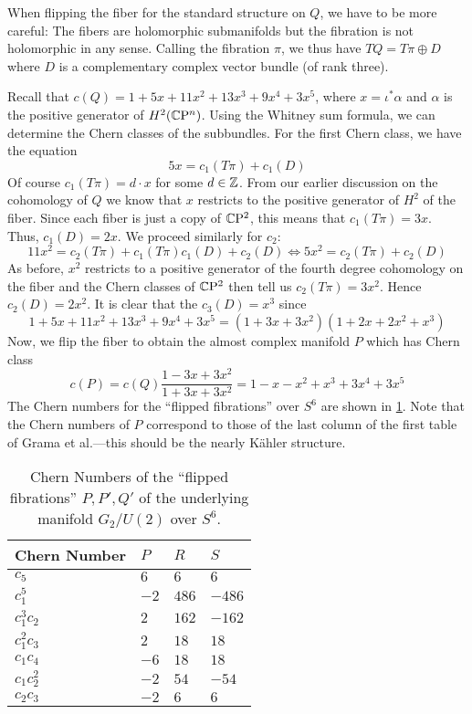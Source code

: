 \documentclass{scrartcl}
\begin{document}
When flipping the fiber for the standard structure on $Q$, we have to be more careful: The fibers are holomorphic submanifolds but the fibration is not holomorphic in any sense. Calling the fibration $\pi$, we thus have $TQ=T\pi\oplus D$ where $D$ is a complementary complex vector bundle (of rank three). 

\medskip

Recall that $c(Q)=1+5x+11x^2+13x^3+9x^4+3x^5$, where $x=\iota^*\alpha$ and $\alpha$ is the positive generator of $H^2(\mathbb{C}\mathrm{P}^n)$. Using the Whitney sum formula, we can determine the Chern classes of the subbundles. For the first Chern class, we have the equation
\begin{equation*}
	5x=c_1(T\pi)+c_1(D)
\end{equation*}
Of course $c_1(T\pi)=d\cdot x$ for some $d\in\mathbb{Z}$. From our earlier discussion on the cohomology of $Q$ we know that $x$ restricts to the positive generator of $H^2$ of the fiber. Since each fiber is just a copy of $\mathbb{C}\mathrm{P}^2$, this means that $c_1(T\pi)=3x$. Thus, $c_1(D)=2x$. We proceed similarly for $c_2$:
\begin{equation*}
	11x^2=c_2(T\pi)+c_1(T\pi)c_1(D)+c_2(D)\Leftrightarrow 5x^2=c_2(T\pi)+c_2(D)
\end{equation*}
As before, $x^2$ restricts to a positive generator of the fourth degree cohomology on the fiber and the Chern classes of $\mathbb{C}\mathrm{P}^2$ then tell us $c_2(T\pi)=3x^2$. Hence $c_2(D)=2x^2$. It is clear that the $c_3(D)=x^3$ since
\begin{equation*}
	1+5x+11x^2+13x^3+9x^4+3x^5=(1+3x+3x^2)(1+2x+2x^2+x^3)
\end{equation*}
Now, we flip the fiber to obtain the almost complex manifold $P$ which has Chern class
\begin{equation*}
	c(P)=c(Q)\frac{1-3x+3x^2}{1+3x+3x^2}=1-x-x^2+x^3+3x^4+3x^5
\end{equation*}
The Chern numbers for the ``flipped fibrations'' over $S^6$ are shown in \cref{tab:flippedS6}. Note that the Chern numbers of $P$ correspond to those of the last column of the first table of Grama et al.---this should be the nearly K\"{a}hler structure.

\begin{table}[ht!]\centering
	\begin{tabular}{llll} \toprule
		Chern Number& $P$	& $R$	& $S$	\\ \midrule
		$c_5$ 		& $6$ 	& $6$	& $6$ 	\\
		$c_1^5$ 	& $-2$	& $486$	& $-486$\\
		$c_1^3c_2$	& $2$	& $162$ & $-162$\\
		$c_1^2c_3$	& $2$	& $18$ 	& $18$	\\
		$c_1c_4$	& $-6$	& $18$ 	& $18$	\\
		$c_1c_2^2$	& $-2$	& $54$ 	& $-54$	\\
		$c_2c_3$	& $-2$	& $6$	& $6$	\\ \bottomrule
	\end{tabular}
	\caption{Chern Numbers of the ``flipped fibrations'' $P,P',Q'$ of the underlying manifold $G_2/U(2)$ over $S^6$.}\label{tab:flippedS6}
\end{table}
\end{document}
